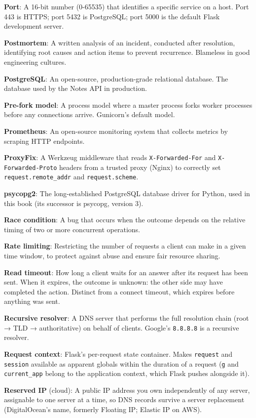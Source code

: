 \textbf{Port}: A 16-bit number (0-65535) that identifies a specific service on a host. Port 443 is HTTPS; port 5432 is PostgreSQL; port 5000 is the default Flask development server.

\textbf{Postmortem}: A written analysis of an incident, conducted after resolution, identifying root causes and action items to prevent recurrence. Blameless in good engineering cultures.

\textbf{PostgreSQL}: An open-source, production-grade relational database. The database used by the Notes API in production.

\textbf{Pre-fork model}: A process model where a master process forks worker processes before any connections arrive. Gunicorn's default model.

\textbf{Prometheus}: An open-source monitoring system that collects metrics by scraping HTTP endpoints.

\textbf{ProxyFix}: A Werkzeug middleware that reads \texttt{X-Forwarded-For} and \texttt{X-Forwarded-Proto} headers from a trusted proxy (Nginx) to correctly set \texttt{request.remote\_addr} and \texttt{request.scheme}.

\textbf{psycopg2}: The long-established PostgreSQL database driver for Python, used in this book (its successor is psycopg, version 3).

\textbf{Race condition}: A bug that occurs when the outcome depends on the relative timing of two or more concurrent operations.

\textbf{Rate limiting}: Restricting the number of requests a client can make in a given time window, to protect against abuse and ensure fair resource sharing.

\textbf{Read timeout}: How long a client waits for an answer after its request has been sent. When it expires, the outcome is unknown: the other side may have completed the action. Distinct from a connect timeout, which expires before anything was sent.

\textbf{Recursive resolver}: A DNS server that performs the full resolution chain (root → TLD → authoritative) on behalf of clients. Google's \texttt{8.8.8.8} is a recursive resolver.

\textbf{Request context}: Flask's per-request state container. Makes \texttt{request} and \texttt{session} available as apparent globals within the duration of a request (\texttt{g} and \texttt{current\_app} belong to the application context, which Flask pushes alongside it).

\textbf{Reserved IP} (cloud): A public IP address you own independently of any server, assignable to one server at a time, so DNS records survive a server replacement (DigitalOcean's name, formerly Floating IP; Elastic IP on AWS).

